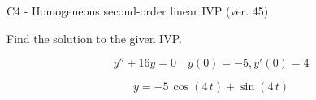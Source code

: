 \begin{exercise}
  \begin{exerciseTitle}C4 - Homogeneous second-order linear IVP (ver. 45)\end{exerciseTitle}
  \begin{exerciseStatement}
    
Find the solution to the given IVP.

    
\[y''+16y = 0 \hspace{1em} y(0) = -5 , y'(0) = 4\]

  \end{exerciseStatement}
  \begin{exerciseAnswer}
    
\[y= -5 \, \cos\left(4 \, t\right) + \sin\left(4 \, t\right)\]

  \end{exerciseAnswer}
\end{exercise}